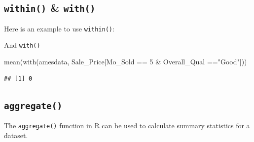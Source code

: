 \documentclass[
]{book}
\newenvironment{Shaded}{\begin{snugshade}}{\end{snugshade}}
\newcommand{\CommentTok}[1]{\textcolor[rgb]{0.56,0.35,0.01}{\textit{#1}}}
\newcommand{\DecValTok}[1]{\textcolor[rgb]{0.00,0.00,0.81}{#1}}
\newcommand{\FunctionTok}[1]{\textcolor[rgb]{0.00,0.00,0.00}{#1}}
\newcommand{\NormalTok}[1]{#1}
\newcommand{\OtherTok}[1]{\textcolor[rgb]{0.56,0.35,0.01}{#1}}
\newcommand{\SpecialCharTok}[1]{\textcolor[rgb]{0.00,0.00,0.00}{#1}}
\newcommand{\StringTok}[1]{\textcolor[rgb]{0.31,0.60,0.02}{#1}}
\theoremstyle{definition}
\theoremstyle{definition}
\theoremstyle{definition}
\theoremstyle{definition}
\theoremstyle{remark}
\begin{document}
\hypertarget{within-with}{%
\subsection{\texorpdfstring{\texttt{within()} \& \texttt{with()}}{within() \& with()}}\label{within-with}}

Here is an example to use \texttt{within()}:

\begin{Shaded}
\end{Shaded}

And \texttt{with()}

\begin{Shaded}
\begin{Highlighting}[]
\FunctionTok{mean}\NormalTok{(}\FunctionTok{with}\NormalTok{(amesdata, Sale\_Price[Mo\_Sold }\SpecialCharTok{==} \DecValTok{5}  \SpecialCharTok{\&}\NormalTok{  Overall\_Qual }\SpecialCharTok{==}\StringTok{"Good"}\NormalTok{]))}
\end{Highlighting}
\end{Shaded}

\begin{verbatim}
## [1] 0
\end{verbatim}

\hypertarget{aggregate}{%
\subsection{\texorpdfstring{\texttt{aggregate()}}{aggregate()}}\label{aggregate}}

The \texttt{aggregate()} function in R can be used to calculate summary statistics for a dataset.
\end{document}
